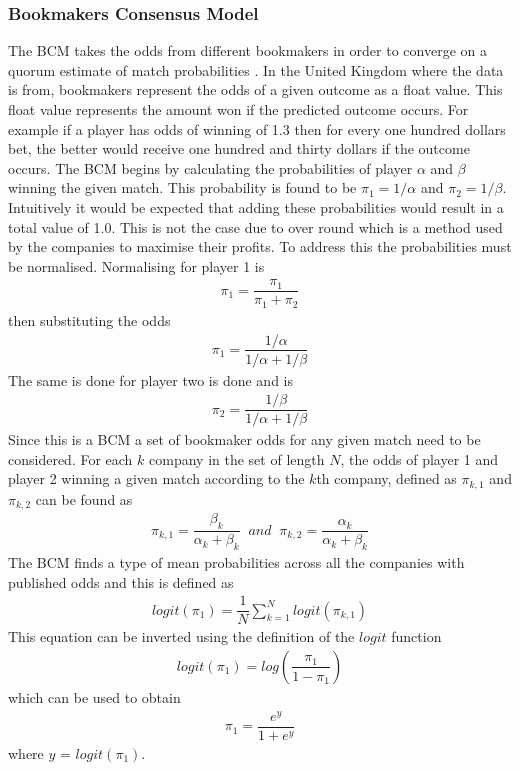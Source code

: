 \documentclass[12pt,a4paper]{article}
\begin{document}
\subsubsection{Bookmakers Consensus Model}
The BCM takes the odds from different bookmakers in order to
converge on a quorum estimate of match probabilities \cite{BCM}. In the United Kingdom where
the data is from, bookmakers represent the odds of a given outcome as a float value.
This float value represents the amount won if the predicted outcome occurs. For example if
a player has odds of winning of 1.3 then for every one hundred dollars bet, the better
would receive one hundred and thirty dollars if the outcome occurs. The BCM begins by calculating the probabilities of player $\alpha$ and $\beta$
winning the given match. This probability is found to be $\pi_1 = 1/\alpha$ and $\pi_2=1/\beta$.
Intuitively it would be expected that adding these probabilities would result in a
total value of 1.0. This is not the case due to over round which is a method used
by the companies to maximise their profits. To address this the probabilities must be
normalised. Normalising for player 1 is
\begin{gather}
  \pi_1 = \dfrac{\pi_1}{\pi_1+\pi_2}
\end{gather}
then substituting the odds
\begin{gather}
  \pi_1 = \dfrac{1/\alpha}{1/\alpha+1/\beta}
\end{gather}
The same is done for player two is done and is
\begin{gather}
  \pi_2 = \dfrac{1/\beta}{1/\alpha+1/\beta}
\end{gather}
Since this is a BCM a set of bookmaker odds for any given match
need to be considered. For each $k$ company in the set of length $N$, the odds of player 1 and player 2
winning a given match according to the $k$th company, defined as $\pi_{k,1}$ and $\pi_{k,2}$
can be found as
\begin{gather}
  \pi_{k,1} = \dfrac{\beta_k}{\alpha_k+\beta_k}\;\;and\;\;\pi_{k,2} = \dfrac{\alpha_k}{\alpha_k+\beta_k}
\end{gather}
The BCM finds a type of mean probabilities across all the companies with published odds
and this is defined as
\begin{gather}
  logit(\pi_1) = \dfrac{1}{N}\sum_{k=1}^{N}logit(\pi_{k,1})
\end{gather}
This equation can be inverted using the definition of the $logit$ function
\begin{gather}
  logit(\pi_1) = log(\dfrac{\pi_1}{1-\pi_1})
\end{gather}
which can be used to obtain
\begin{gather}
  \pi_1 = \dfrac{e^y}{1+e^y}
\end{gather}
where $y$ = $logit(\pi_1)$.
\end{document}
